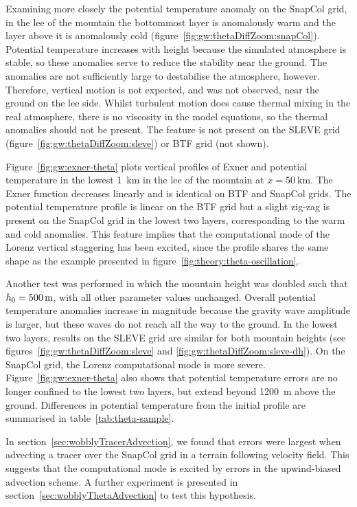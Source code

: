 Examining more closely the potential temperature anomaly on the SnapCol grid, in the lee of the mountain the bottommost layer is anomalously warm and the layer above it is anomalously cold (figure~\ref{fig:gw:thetaDiffZoom:snapCol}).  Potential temperature increases with height because the simulated atmosphere is stable, so these anomalies serve to reduce the stability near the ground.  The anomalies are not sufficiently large to destabilise the atmosphere, however.   Therefore, vertical motion is not expected, and was not observed, near the ground on the lee side.   Whilst turbulent motion does cause thermal mixing in the real atmosphere, there is no viscosity in the model equations, so the thermal anomalies should not be present.  The feature is not present on the SLEVE grid (figure~\ref{fig:gw:thetaDiffZoom:sleve}) or BTF grid (not shown).

Figure~\ref{fig:gw:exner-theta} plots vertical profiles of Exner and potential temperature in the lowest \SI{1}{\kilo\meter} in the lee of the mountain at $x = \SI{50}{\kilo\meter}$.  The Exner function decreases linearly and is identical on BTF and SnapCol grids.  The potential temperature profile is linear on the BTF grid but a slight zig-zag is present on the SnapCol grid in the lowest two layers, corresponding to the warm and cold anomalies.
This feature implies that the computational mode of the Lorenz vertical staggering has been excited, since the profile shares the same shape as the example presented in figure~\ref{fig:theory:theta-oscillation}.

Another test was performed in which the mountain height was doubled such that $h_0 = \SI{500}{\meter}$, with all other parameter values unchanged.  Overall potential temperature anomalies increase in magnitude because the gravity wave amplitude is larger, but these waves do not reach all the way to the ground.  In the lowest two layers, results on the SLEVE grid are similar for both mountain heights (see figures~\ref{fig:gw:thetaDiffZoom:sleve} and \ref{fig:gw:thetaDiffZoom:sleve-dh}).  On the SnapCol grid, the Lorenz computational mode is more severe.  Figure~\ref{fig:gw:exner-theta} also shows that potential temperature errors are no longer confined to the lowest two layers, but extend beyond \SI{1200}{\meter} above the ground.  Differences in potential temperature from the initial profile are summarised in table~\ref{tab:theta-sample}.

In section~\ref{sec:wobblyTracerAdvection}, we found that errors were largest when advecting a tracer over the SnapCol grid in a terrain following velocity field.  This suggests that the computational mode is excited by errors in the upwind-biased advection scheme.  A further experiment is presented in section~\ref{sec:wobblyThetaAdvection} to test this hypothesis.

